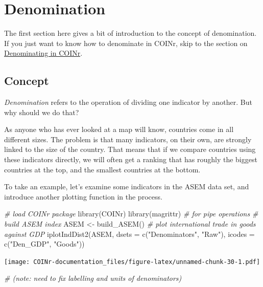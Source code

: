 \documentclass[
]{book}
\newenvironment{Shaded}{\begin{snugshade}}{\end{snugshade}}
\newcommand{\AttributeTok}[1]{\textcolor[rgb]{0.77,0.63,0.00}{#1}}
\newcommand{\CommentTok}[1]{\textcolor[rgb]{0.56,0.35,0.01}{\textit{#1}}}
\newcommand{\FunctionTok}[1]{\textcolor[rgb]{0.00,0.00,0.00}{#1}}
\newcommand{\NormalTok}[1]{#1}
\newcommand{\OtherTok}[1]{\textcolor[rgb]{0.56,0.35,0.01}{#1}}
\newcommand{\StringTok}[1]{\textcolor[rgb]{0.31,0.60,0.02}{#1}}
\begin{document}
\hypertarget{denomination}{%
\chapter{Denomination}\label{denomination}}

The first section here gives a bit of introduction to the concept of denomination. If you just want to know how to denominate in COINr, skip to the section on \protect\hyperlink{denominating-in-coinr}{Denominating in COINr}.

\hypertarget{concept-1}{%
\section{Concept}\label{concept-1}}

\emph{Denomination} refers to the operation of dividing one indicator by another. But why should we do that?

As anyone who has ever looked at a map will know, countries come in all different sizes. The problem is that many indicators, on their own, are strongly linked to the size of the country. That means that if we compare countries using these indicators directly, we will often get a ranking that has roughly the biggest countries at the top, and the smallest countries at the bottom.

To take an example, let's examine some indicators in the ASEM data set, and introduce another plotting function in the process.

\begin{Shaded}
\begin{Highlighting}[]
\CommentTok{\# load COINr package}
\FunctionTok{library}\NormalTok{(COINr)}
\FunctionTok{library}\NormalTok{(magrittr) }\CommentTok{\# for pipe operations}
\CommentTok{\# build ASEM index}
\NormalTok{ASEM }\OtherTok{\textless{}{-}} \FunctionTok{build\_ASEM}\NormalTok{()}
\CommentTok{\# plot international trade in goods against GDP}
\FunctionTok{iplotIndDist2}\NormalTok{(ASEM, }\AttributeTok{dsets =} \FunctionTok{c}\NormalTok{(}\StringTok{"Denominators"}\NormalTok{, }\StringTok{"Raw"}\NormalTok{), }\AttributeTok{icodes =} \FunctionTok{c}\NormalTok{(}\StringTok{"Den\_GDP"}\NormalTok{, }\StringTok{"Goods"}\NormalTok{))}
\end{Highlighting}
\end{Shaded}

\texttt{[image: COINr-documentation\_files/figure-latex/unnamed-chunk-30-1.pdf]}

\begin{Shaded}
\begin{Highlighting}[]
\CommentTok{\# (note: need to fix labelling and units of denominators)}
\end{Highlighting}
\end{Shaded}
\end{document}
